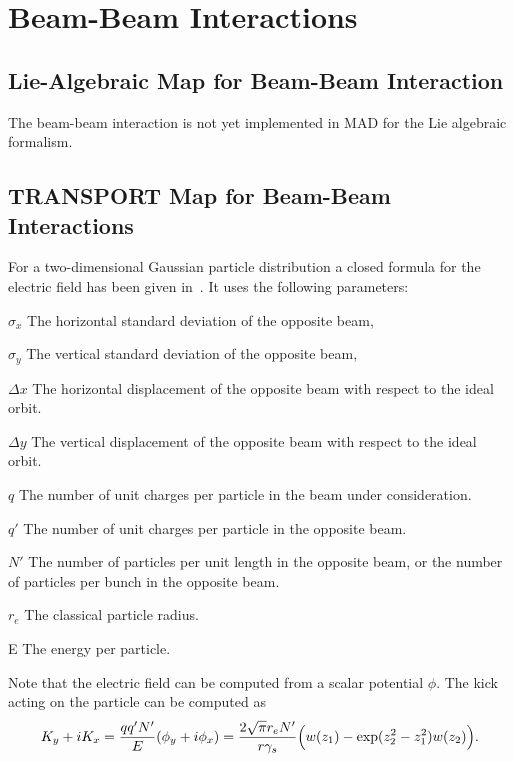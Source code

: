  
\section{Beam-Beam Interactions}
\label{beam-beam}
 
\subsection{Lie-Algebraic Map for Beam-Beam Interaction}
The beam-beam interaction is not yet implemented in MAD
for the Lie algebraic formalism.
 
\subsection{TRANSPORT Map for Beam-Beam Interactions}
For a two-dimensional Gaussian particle distribution a closed formula
for the electric field has been given in~\cite{BAS80}.
It uses the following parameters:
\begin{mylist}
\item[$\sigma_x$]
The horizontal standard deviation of the opposite beam,
\item[$\sigma_y$]
The vertical standard deviation of the opposite beam,
\item[$\Delta x$]
The horizontal displacement of the opposite beam with respect to the
ideal orbit.
\item[$\Delta y$]
The vertical displacement of the opposite beam with respect to the
ideal orbit.
\item[$q$]
The number of unit charges per particle in the beam under consideration.
\item[$q'$]
The number of unit charges per particle in the opposite beam.
\item[$N'$]
The number of particles per unit length in the opposite beam,
or the number of particles per bunch in the opposite beam.
\item[$r_e$]
The classical particle radius.
\item[E]
The energy per particle.
\end{mylist}
Note that the electric field can be computed from a scalar potential $\phi$.
The kick acting on the particle can be computed as
\begin{equation}
K_y + i K_x =
\frac{qq'N'}{E} (\phi_y + i \phi_x) =
\frac{2\sqrt{\pi}r_eN'}{r\gamma_s} \Bigl(w(z_1) - \exp(z_2^2-z_1^2) w(z_2)\Bigr).
\end{equation}
